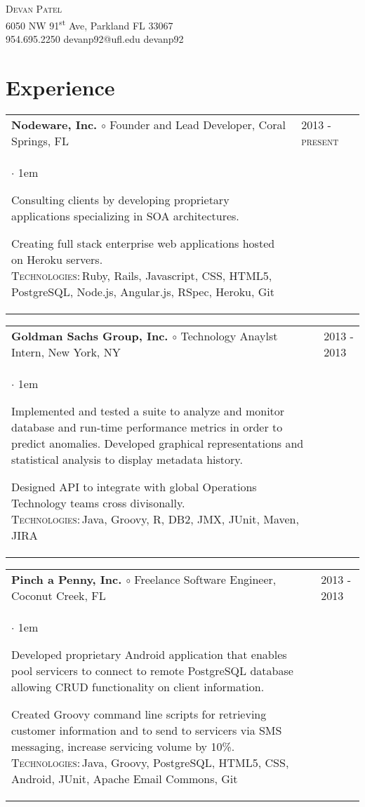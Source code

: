\documentclass[11pt]{article}
\makeatletter
\newcommand{\employer}[4]
	{{ \begin{tabular}{l@{\hspace{5mm}}|p{30mm}}
	   \multicolumn{1}{l}{\textbf{#1 $\circ$ }#2}&\multicolumn{1}{p{30mm}}{\hspace{-3mm}\textsc{#3}} \\
	   \parbox{.825\textwidth}{#4 \vspace*{-4pt}}
	   \end{tabular} \vspace{4pt} }}
\newcommand{\contact}[5]
	{\begin{center}
		{\LARGE \scshape{#1}}\\
		#2\\
		\Telefon \hspace{0.5ex} #3 \hspace{1em} \Letter \hspace{0.5ex} #4 \hspace{1em} \faGithub \hspace{0.5ex} #5
	\end{center}
	\vspace*{-8pt}}
\newenvironment{achievements}           %
	{\begin{list}{$\cdot$}{\topsep 0pt \itemsep 4pt \parsep 0pt \leftmargin 1em}
	 \linespread{1.05} \selectfont %
	}
	{\end{list}\vspace*{4pt}}
\def\kt{\vspace*{2pt}\\\textsc{Technologies:\,}}
\makeatother
\begin{document}
\contact{Devan Patel}
{6050 NW 91\textsuperscript{st} Ave, Parkland FL 33067}
{954.695.2250}
{devanp92@ufl.edu}
{devanp92}
\section{Experience}

\employer{Nodeware, Inc.}{Founder and Lead Developer, Coral Springs, FL}{2013 - present}{
\begin{achievements}

\item{Consulting clients by developing proprietary applications specializing in SOA architectures.}

\item{Creating full stack enterprise web applications hosted on Heroku servers. \kt Ruby, Rails, Javascript, CSS, HTML5, PostgreSQL, Node.js, Angular.js, RSpec, Heroku, Git}

\end{achievements} 
}


\employer{Goldman Sachs Group, Inc.}{Technology Anaylst Intern, New York, NY}{2013 - 2013}{
	\begin{achievements}
	
	\item{Implemented and tested a suite to analyze and monitor database and run-time performance metrics in order to predict  anomalies. Developed graphical representations and statistical analysis to display metadata history.}
		
	\item{Designed API to integrate with global Operations Technology teams cross divisonally.\kt Java, Groovy, R, DB2, JMX, JUnit, Maven, JIRA}

	\end{achievements} 
}


\employer{Pinch a Penny, Inc.}{Freelance Software Engineer, Coconut Creek, FL}{2013 - 2013}{
	\begin{achievements}
	
	\item{Developed proprietary Android application that enables pool servicers to connect to remote PostgreSQL database allowing CRUD functionality on client information.}
	
	\item{Created Groovy command line scripts for retrieving customer information and to send to servicers via SMS messaging, increase servicing volume by 10\%.  \kt Java, Groovy, PostgreSQL, HTML5, CSS, Android, JUnit, Apache Email Commons, Git}
	
	\end{achievements}
}
\end{document}
